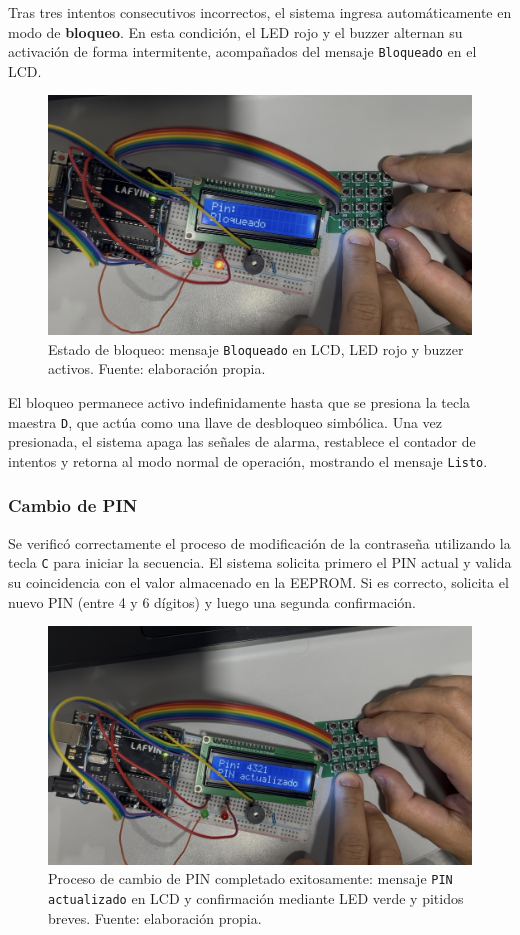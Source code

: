 Tras tres intentos consecutivos incorrectos, el sistema ingresa automáticamente en modo de \textbf{bloqueo}.  
En esta condición, el LED rojo y el buzzer alternan su activación de forma intermitente, 
acompañados del mensaje \texttt{Bloqueado} en el LCD.  

\begin{figure}[H]
    \centering
    \includegraphics[width=0.7\columnwidth]{Anexos/Cerradura_Bloqueado.png}
    \caption{Estado de bloqueo: mensaje \texttt{Bloqueado} en LCD, LED rojo y buzzer activos. Fuente: elaboración propia.}
    \label{fig:cerradura_bloqueado}
\end{figure}

El bloqueo permanece activo indefinidamente hasta que se presiona la tecla maestra \texttt{D}, 
que actúa como una llave de desbloqueo simbólica.  
Una vez presionada, el sistema apaga las señales de alarma, 
restablece el contador de intentos y retorna al modo normal de operación, mostrando el mensaje \texttt{Listo}.

\subsubsection{Cambio de PIN}

Se verificó correctamente el proceso de modificación de la contraseña utilizando la tecla \texttt{C} para iniciar la secuencia.  
El sistema solicita primero el PIN actual y valida su coincidencia con el valor almacenado en la EEPROM.  
Si es correcto, solicita el nuevo PIN (entre 4 y 6 dígitos) y luego una segunda confirmación.  

\begin{figure}[H]
    \centering
    \includegraphics[width=0.7\columnwidth]{Anexos/Cerradura_PINactualizado.png}
    \caption{Proceso de cambio de PIN completado exitosamente: mensaje \texttt{PIN actualizado} en LCD y confirmación mediante LED verde y pitidos breves. Fuente: elaboración propia.}
    \label{fig:cerradura_pin_actualizado}
\end{figure}

